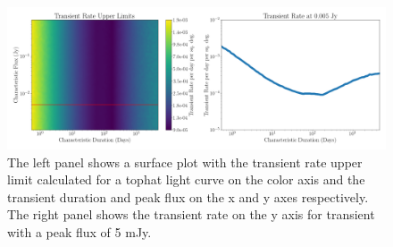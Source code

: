 \documentclass[12pt]{article}
\begin{document}
\begin{figure}
	\includegraphics[width=\textwidth]{commensal2_30min.png}
	\caption{The left panel shows a surface plot with the transient rate upper limit calculated for a tophat light curve on the color axis and the transient duration and peak flux on the x and y axes respectively. The right panel shows the transient rate on the y axis for transient with a peak flux of 5 mJy. }
	\label{fig:transientrate}
\end{figure}
\end{document}
